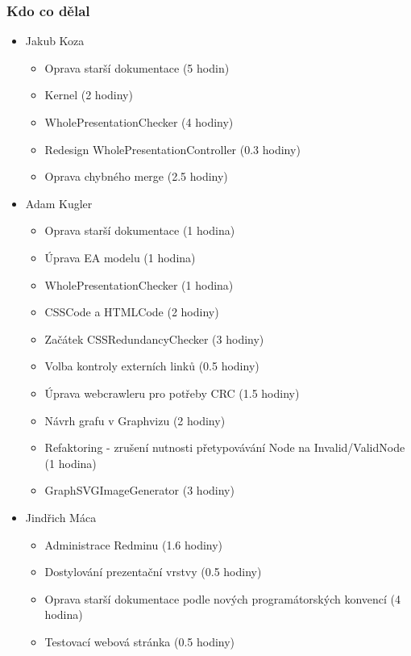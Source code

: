 \documentclass{beamer}
\begin{document}
\begin{frame}[allowframebreaks]\frametitle{Kdo co dělal} 
  \begin{itemize}
    \item Jakub Koza
      \begin{itemize}
       \item Oprava starší dokumentace (5 hodin)
			 \item Kernel (2 hodiny)
			 \item WholePresentationChecker (4 hodiny)
			 \item Redesign WholePresentationController (0.3 hodiny)
			 \item Oprava chybného merge (2.5 hodiny)
     \end{itemize}

    \item Adam Kugler
      \begin{itemize}
       \item Oprava starší dokumentace (1 hodina)
			 \item Úprava EA modelu (1 hodina)
       \item WholePresentationChecker (1 hodina)
			 \item CSSCode a HTMLCode (2 hodiny)
       \item Začátek CSSRedundancyChecker (3 hodiny)
       \item Volba kontroly externích linků (0.5 hodiny)
			 \item Úprava webcrawleru pro potřeby CRC (1.5 hodiny)
			 \item Návrh grafu v Graphvizu (2 hodiny)
       \item Refaktoring - zrušení nutnosti přetypovávání Node na Invalid/ValidNode (1 hodina)
			 \item GraphSVGImageGenerator (3 hodiny)
     \end{itemize}

    \item Jindřich Máca
      \begin{itemize}
       \item Administrace Redminu (1.6 hodiny)
			 \item Dostylování prezentační vrstvy (0.5 hodiny)
			 \item Oprava starší dokumentace podle nových programátorských konvencí (4 hodina)
			 \item Testovací webová stránka (0.5 hodiny)
     \end{itemize}


\end{itemize}
\end{frame}
\end{document}
